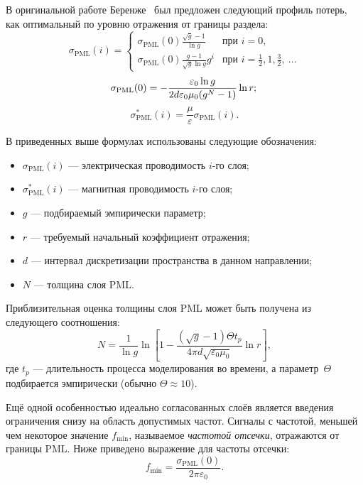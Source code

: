 В оригинальной работе Беренже~\cite{Berenger} был предложен следующий профиль потерь, как оптимальный по уровню отражения от границы раздела:
\begin{equation}
\label{eq:LossProfile1}
\sigma_\text{PML}(i) = \left\{
\begin{array}{ll}
    \sigma_\text{PML}(0)\frac{\sqrt{g}-1}{\ln{g}}     & \text{при~} i=0,\\
    \sigma_\text{PML}(0)\frac{g-1}{\sqrt{g}\ln{g}}g^i & \text{при~} i=\frac12,1,\frac32,~\ldots
\end{array}
\right.
\end{equation}
\begin{equation}
\label{eq:LossProfile2}
\sigma_\text{PML}(0) = -\frac{\varepsilon_0 \ln{g}} {2 d \varepsilon_0\mu_0 (g^N-1)} \ln{r};\\
\end{equation}
\begin{equation}
\label{eq:LossProfile3}
\sigma^{*}_\text{PML}(i) = \frac{\mu}{\varepsilon} \sigma_\text{PML}(i).
\end{equation}

\noindent
В приведенных выше формулах использованы следующие обозначения:
\begin{itemize}[label={}]
\item $ \sigma_\text{PML}(i) $ --- электрическая проводимость $i$-го слоя;
\item $ \sigma^{*}_\text{PML}(i) $ --- магнитная проводимость $i$-го слоя;
\item $g$ --- подбираемый эмпирически параметр;
\item $r$ --- требуемый начальный коэффициент отражения;
\item $d$ --- интервал дискретизации пространства в данном направлении;
\item $N$ --- толщина слоя PML.
\end{itemize}

\noindent
Приблизительная оценка толщины слоя PML может быть получена из следующего
соотношения:
\begin{equation*}
    N= \frac{1}{\ln g} \ln
    \left[
        1 - \frac{(\sqrt{g}-1)\Theta t_p}{4\pi d \sqrt{\varepsilon_0\mu_0}} \ln{r}
    \right],
\end{equation*}
где $t_p$ --- длительность процесса моделирования во времени,
а параметр~$\Theta$ подбирается эмпирически (обычно $\Theta\approx10$).

Ещё одной особенностью идеально согласованных слоёв является введения ограничения снизу на область допустимых частот. Сигналы с частотой, меньшей чем некоторое значение $f_{\text{min}}$, называемое \emph{частотой отсечки}, отражаются от границы PML. Ниже приведено выражение для частоты отсечки:
\begin{equation*}
    f_{\text{min}} = \frac{\sigma_\text{PML}(0)}{2\pi\varepsilon_0}.
\end{equation*}

